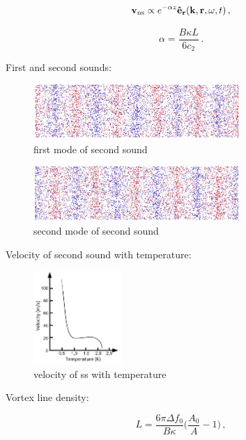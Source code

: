 \begin{equation}
\mathbf{v}_{\mathrm{ns}} \propto e^{-\alpha z} \mathbf{\hat{e}}_{\mathbf{r}}(\mathbf{k},\mathbf{r},\omega,t)\,,
\end{equation}

\begin{equation}
\alpha = \frac{B\kappa L}{6 c_2}
\label{alpha_mean}\,.
\end{equation}


First and second sounds:

\begin{figure}[h]
	\centering
	\includegraphics[width=0.7\textwidth]{graphics/theory/ss_1}
	\caption{first mode of second sound}
	\label{ss_1}
\end{figure}

\begin{figure}[h]
	\centering
	\includegraphics[width=0.7\textwidth]{graphics/theory/ss_2}
	\caption{second mode of second sound}
	\label{ss_2}
\end{figure}

Velocity of second sound with temperature:

\begin{figure}[h]
	\centering
	\includegraphics[width=0.3\textwidth]{graphics/theory/ss_velocity}
	\caption{velocity of ss with temperature}
	\label{ss_velocity}
\end{figure}

Vortex line density:

\begin{equation}
L = \frac{6\pi \Delta f_0}{B\kappa}\bigg( \frac{A_0}{A} - 1 \bigg)\,,
\label{L}
\end{equation}


\newpage
